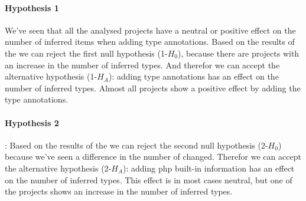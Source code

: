 \documentclass[../main.tex]{subfiles}
\begin{document}
	\paragraph{Hypothesis 1}
	We've seen that all the analysed projects have a neutral or positive effect on the number of inferred items when adding type annotations.
	Based on the results of the we can reject the first null hypothesis (1-$H_0$), because there are projects with an increase in the number of inferred types. 
	And therefor we can accept the alternative hypothesis (1-$H_A$): adding type annotations has an effect on the number of inferred types.
	Almost all projects show a positive effect by adding the type annotations.

	\paragraph{Hypothesis 2}:
	Based on the results of the we can reject the second null hypothesis (2-$H_0$) because we've seen a difference in the number of changed. 
	Therefor we can accept the alternative hypothesis (2-$H_A$): adding php built-in information has an effect on the number of inferred types.
	This effect is in most cases neutral, but one of the projects shows an increase in the number of inferred types.
		
\end{document}
